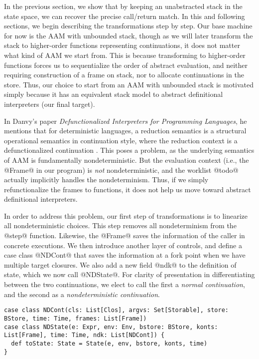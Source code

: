 \documentclass[acmsmall,review,anonymous]{acmart}\settopmatter{printfolios=true,printccs=false,printacmref=false}
\begin{document}
In the previous section, we show that by keeping an unabstracted stack in the state
space, we can recover the precise call/return match.
In this and following sections, we begin describing the transformations step by step.
Our base machine for now is the AAM with unbounded stack, though
as we will later transform the stack to higher-order functions
representing continuations, it does not matter what kind of AAM we start from.
This is because transforming to higher-order functions forces us to sequentialize
the order of abstract evaluation, and neither requiring construction of a frame on stack,
nor to allocate continuations in the store.
Thus, our choice to start from an AAM with unbounded stack is motivated simply because
it has an equivalent stack model to abstract definitional interpreters (our final target).

In Danvy's paper \textit{Defunctionalized Interpreters for Programming
  Languages}, he mentions that for deterministic languages, a reduction semantics
is a structural operational semantics in continuation style, where the reduction
context is a defunctionalized continuation \cite{Danvy:2008:DIP:1411204.1411206}.
This poses a problem, as the underlying semantics of AAM is fundamentally nondeterministic.
But the evaluation context (i.e., the @Frame@ in our program) is \emph{not}
nondeterministic, and the worklist @todo@ actually implicitly handles the nondeterminism.
Thus, if we simply refunctionalize the frames to functions, it does not help us move toward
abstract definitional interpreters.

In order to address this problem, our first step of transformations
is to linearize all nondeterministic choices.
This step removes all nondeterminism from the @step@ function.
Likewise, the @Frame@ saves the information of the caller in concrete executions.
We then introduce another layer of controls, and define a case class @NDCont@
that saves the information at a fork point when we have multiple target closures.
We also add a new field @ndk@ to the definition of state, which we now call @NDState@.
For clarity of presentation in differentiating between the two continuations, we elect to call
the first a \emph{normal continuation}, and the second as a \emph{nondeterministic
continuation}.

\begin{lstlisting}
case class NDCont(cls: List[Clos], argvs: Set[Storable], store: BStore, time: Time, frames: List[Frame])
case class NDState(e: Expr, env: Env, bstore: BStore, konts: List[Frame], time: Time, ndk: List[NDCont]) {
  def toState: State = State(e, env, bstore, konts, time)
}
\end{lstlisting}
\end{document}
